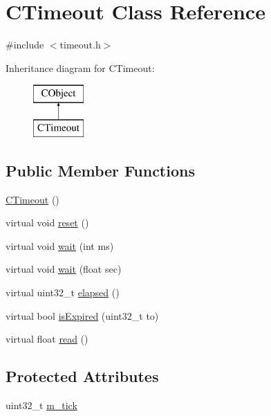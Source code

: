 \hypertarget{class_c_timeout}{\section{C\-Timeout Class Reference}
\label{class_c_timeout}
}


{\ttfamily \#include $<$timeout.\-h$>$}

Inheritance diagram for C\-Timeout\-:\begin{figure}[H]
\begin{center}
\leavevmode
\includegraphics[height=2.000000cm]{d5/d5b/class_c_timeout}
\end{center}
\end{figure}
\subsection*{Public Member Functions}
\begin{DoxyCompactItemize}
\item 
\hyperlink{class_c_timeout_ac01d1f8a0d214687ff63cd6d915729de}{C\-Timeout} ()
\item 
virtual void \hyperlink{class_c_timeout_a663a09bb51c1de8f8d83bd62fdc1a688}{reset} ()
\item 
virtual void \hyperlink{class_c_timeout_a05315e59fa44ceafe8c9e444af0ac9e8}{wait} (int ms)
\item 
virtual void \hyperlink{class_c_timeout_ab2edd08150efbd3ef36766c7e02f7792}{wait} (float sec)
\item 
virtual uint32\-\_\-t \hyperlink{class_c_timeout_a1858ddcad4e18f8056441072616a457f}{elapsed} ()
\item 
virtual bool \hyperlink{class_c_timeout_a3841c7c53689d2ef8559a6c5e402aa5b}{is\-Expired} (uint32\-\_\-t to)
\item 
virtual float \hyperlink{class_c_timeout_a8af3a09c9ed9172b37e930d05865cfac}{read} ()
\end{DoxyCompactItemize}
\subsection*{Protected Attributes}
\begin{DoxyCompactItemize}
\item 
uint32\-\_\-t \hyperlink{class_c_timeout_a70d74daffca8e29ae4682dae45bb9f8f}{m\-\_\-tick}
\end{DoxyCompactItemize}


